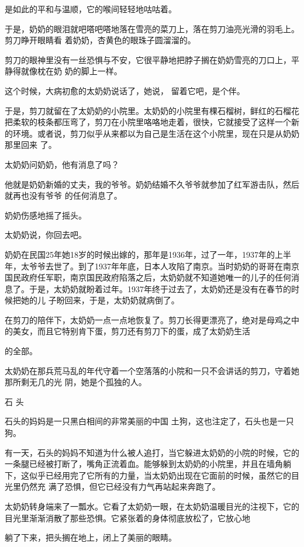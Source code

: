 \documentclass{article}
\begin{document}
是如此的平和与温顺，它的喉间轻轻地咕咕着。 

于是，奶奶的眼泪就吧嗒吧嗒地落在雪亮的菜刀上，落在剪刀油亮光滑的羽毛上。剪刀睁开眼睛看
着奶奶，杏黄色的眼珠子圆溜溜的。 

剪刀的眼神里没有一丝恐惧与不安，它很平静地把脖子搁在奶奶雪亮的刀口上，平静得就像枕在奶
奶的脚上一样。 

这个时候，大病初愈的太奶奶说话了，她说，
留着它吧，是个伴。 

于是，剪刀就留在了太奶奶的小院里。太奶奶的小院里有棵石榴树，鲜红的石榴花把柔软的枝条都压弯了，剪刀在小院里咯咯地走着，很快，它就接受了这样一个新的环境。或者说，剪刀似乎从来都以为自己是生活在这个小院里，现在只是从奶奶那里回来
了。 


\newpage

太奶奶问奶奶，他有消息了吗？ 

他就是奶奶新婚的丈夫，我的爷爷。奶奶结婚不久爷爷就参加了红军游击队，然后就再也没有爷爷
的任何消息了。 


奶奶伤感地摇了摇头。 


太奶奶说，你回去吧。 

奶奶在民国25年她18岁的时候出嫁的，那年是1936年，过了一年，1937年的上半年，太爷爷去世了。到了1937年年底，日本人攻陷了南京。当时奶奶的哥哥在南京国民政府任军职，南京国民政府陷落之后，太奶奶就不知道她唯一的儿子的任何消息了。于是，太奶奶就盼着过年。1937年终于过去了，太奶奶还是没有在春节的时候把她的儿
子盼回来，于是，太奶奶就病倒了。 

在剪刀的陪伴下，太奶奶一点一点地恢复了。剪刀长得更漂亮了，绝对是母鸡之中的美女，而且它特别肯下蛋，剪刀还有剪刀下的蛋，成了太奶奶生活
\newpage

的全部。 

太奶奶在那兵荒马乱的年代守着一个空落落的小院和一只不会讲话的剪刀，守着她那所剩无几的光
阴，她是个孤独的人。 


石 头 

石头的妈妈是一只黑白相间的非常美丽的中国
土狗，这也注定了，石头也是一只狗。 

有一天，石头的妈妈不知道为什么被人追打，当它躲进太奶奶的小院的时候，它的一条腿已经被打断了，嘴角正流着血。能够躲到太奶奶的小院里，并且在墙角躺下，这似乎已经用完了它所有的力量，当太奶奶出现在它面前的时候，虽然它的目光里仍然充
满了恐惧，但它已经没有力气再站起来奔跑了。 

太奶奶转身端来了一瓢水。它看了太奶奶一眼，在太奶奶温暖目光的注视下，它的目光里渐渐消散了那些恐惧。它紧张着的身体彻底放松了，它放心地
\newpage

躺了下来，把头搁在地上，闭上了美丽的眼睛。 
\end{document}
